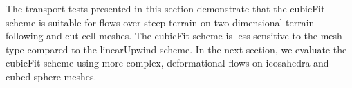 The transport tests presented in this section demonstrate that the cubicFit scheme is suitable for flows over steep terrain on two-dimensional terrain-following and cut cell meshes.  The cubicFit scheme is less sensitive to the mesh type compared to the linearUpwind scheme.  In the next section, we evaluate the cubicFit scheme using more complex, deformational flows on icosahedra and cubed-sphere meshes.
